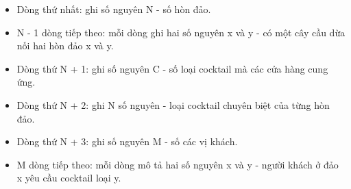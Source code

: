\begin{itemize}
	\item     Dòng thứ nhất: ghi số nguyên N - số hòn đảo.   
	\item     N - 1 dòng tiếp theo: mỗi dòng ghi hai số nguyên x và y - có một cây cầu dừa nối hai hòn đảo x và y.   
	\item     Dòng thứ N + 1: ghi số nguyên C - số loại cocktail mà các cửa hàng cung ứng.   
	\item     Dòng thứ N + 2: ghi N số nguyên - loại cocktail chuyên biệt của từng hòn đảo.   
	\item     Dòng thứ N + 3: ghi số nguyên M - số các vị khách.   
	\item     M dòng tiếp theo: mỗi dòng mô tả hai số nguyên x và y - người khách ở đảo x yêu cầu cocktail loại y.   
\end{itemize}